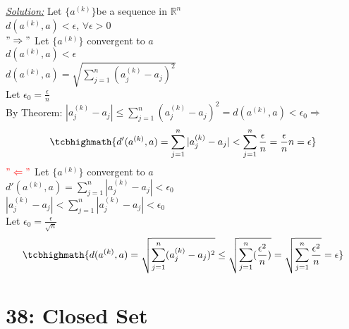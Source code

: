 \documentclass{amsbook}
\begin{document}
\begin{tcolorbox}[enhanced,attach boxed title to top center={yshift=-3mm,yshifttext=-1mm},
  colback=blue!5!white,colframe=blue!75!black,colbacktitle=red!80!black,
  title=Exercise 37.9 (b):,fonttitle=\bfseries,
  boxed title style={size=small,colframe=red!50!black} ]
   \textit{\color{blue}\underline{Solution:}}
Let $\{a^{(k)}\}$be a sequence in $\mathbb{R}^n$\\
$d(a^{(k)},a)<\epsilon$, $\forall\epsilon>0$\\
{\color{red}$"\Rightarrow"$} Let $\{a^{(k)}\}$ convergent to $a$\\
$d(a^{(k)},a)<\epsilon$\\
$d(a^{(k)},a)=\sqrt{\sum_{j=1}^{n}(a_j^{(k)}-a_j)^2}$\\
Let $\epsilon_0=\frac{\epsilon}{n}$\\
By Theorem: $|a_j^{(k)}-a_j|\leq{\sum_{j=1}^{n}(a_j^{(k)}-a_j)^2}=d(a^{(k)},a)<\epsilon_0\Rightarrow$\\ 
  $$\tcbhighmath{d'(a^{(k)},a)=\sum_{j=1}^{n}|a_j^{(k)}-a_j|<\sum_{j=1}^{n}\frac{\epsilon}{n}=\frac{\epsilon}{n}
  n=\epsilon}$$
$\color{red}"\Leftarrow"$ Let $\{a^{(k)}\}$ convergent to $a$\\
$d'(a^{(k)},a)=\sum_{j=1}^{n}|a_j^{(k)}-a_j|<\epsilon_0$\\
$|a_j
^{(k)}-a_j|<\sum_{j=1}^{n}|a_j^{(k)}-a_j|<\epsilon_0$\\
Let $\epsilon_0=\frac{\epsilon}{\sqrt{n}}$\\
 $$\tcbhighmath{d(a^{(k)},a)=\sqrt{\sum_{j=1}^{n}(a_j^{(k)}-a_j)^2}\leq 
 \sqrt{\sum_{j=1}^{n}(\frac{\epsilon^2}{n})}=\sqrt{\sum_{j=1}^{n}\frac{\epsilon^2}{n}}=\epsilon}$$
 \end{tcolorbox}

\section{38: Closed Set}

  
  
\end{document}
